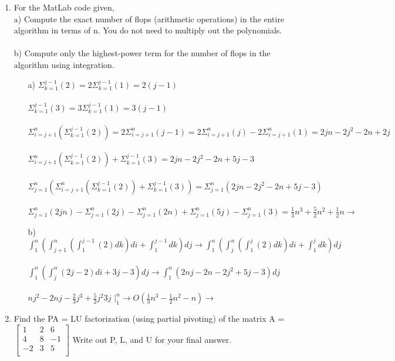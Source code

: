 \documentclass[12pt]{article}
\begin{document}
\begin{enumerate}

	\item For the MatLab code given,\\a) Compute the exact number of flops (arithmetic operations) in the entire algorithm in terms of
n. You do not need to multiply out the polynomials. \\ \\b) Compute only the highest-power term for the number of flops in the algorithm using
integration. 
	\begin{itemize}
		\item[a)] $\Sigma_{k=1}^{j-1}(2) = 2\Sigma_{k=1}^{j-1}(1) = 2(j-1)$ \\ \\
		$\Sigma_{k=1}^{j-1}(3) = 3\Sigma_{k=1}^{j-1}(1) = 3(j-1)$ \\ \\
		$\Sigma_{i=j+1}^{n}(\Sigma_{k=1}^{j-1}(2)) = 2\Sigma_{i=j+1}^{n}(j-1) = 2\Sigma_{i=j+1}^{n}(j) - 2\Sigma_{i=j+1}^{n}(1) = 2jn-2j^2-2n+2j$ \\ \\
		$\Sigma_{i=j+1}^{n}(\Sigma_{k=1}^{j-1}(2)) + \Sigma_{k=1}^{j-1}(3) = 2jn-2j^2-2n+5j-3$ \\ \\
		$\Sigma_{j=1}^n(\Sigma_{i=j+1}^{n}(\Sigma_{k=1}^{j-1}(2)) + \Sigma_{k=1}^{j-1}(3)) = \Sigma_{j=1}^n(2jn-2j^2-2n+5j-3)$ \\ \\
$\Sigma_{j=1}^n(2jn) - \Sigma_{j=1}^n(2j) - \Sigma_{j=1}^n(2n) + \Sigma_{j=1}^n(5j) - \Sigma_{j=1}^n(3) = \frac{1}{3}n^3 + \frac{5}{2}n^2+\frac{1}{2}n \rightarrow$ \\
	\item[b)] $\int_1^n(\int_{j+1}^n(\int_1^{j-1}(2)dk)di + \int_1^{j-1}dk)dj \rightarrow \int_1^n(\int_{j}^n(\int_1^{j}(2)dk)di + \int_1^{j}dk)dj$ \\ \\
	$\int_1^n(\int_{j}^n(2j-2)di + 3j-3)dj \rightarrow \int_1^n(2nj -2n -2j^2 +5j -3)dj$ \\ \\
	$nj^2 - 2nj -\frac{2}{3}j^3 + \frac{5}{2}j^2 3j$ $|_1^n\rightarrow O(\frac{1}{3}n^3 - \frac{1}{2}n^2 -n) \rightarrow $ 	
	\end{itemize}
	
	\item Find the PA = LU factorization (using partial pivoting) of the matrix A = 
$
\begin{bmatrix}
   1 & 2 & 6 \\
   4 & 8 & -1 \\
   -2 & 3 & 5 \\
\end{bmatrix}
$
Write out P, L, and U for your final answer. \\ \\



\end{enumerate}
\end{document}

